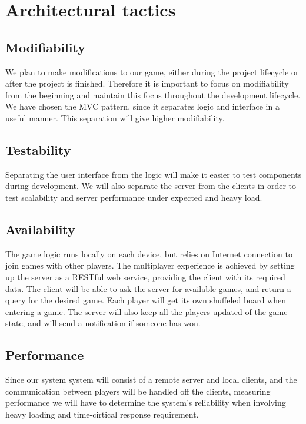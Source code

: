 \section{Architectural tactics}
\label{sec:architecturaltactics}

\subsection{Modifiability} 
We plan to make modifications to our game, either during the project lifecycle or after the project is finished. Therefore it is important to focus on modifiability from the beginning and maintain this focus throughout the development lifecycle. 
We have chosen the MVC pattern, since it separates logic and interface in a useful manner. This separation will give higher modifiability.

\subsection{Testability}
Separating the user interface from the logic will make it easier to test components during development. We will also separate the server from the clients in order to test scalability and server performance under expected and heavy load.


\subsection{Availability} 
The game logic runs locally on each device, but relies on Internet connection to join games with other players. The multiplayer experience is achieved by setting up the server as a RESTful web service, providing the client with its required data. The client will be able to ask the server for available games, and return a query for the desired game. Each player will get its own shuffeled board when entering a game. The server will also keep all the players updated of the game state, and will send a notification if someone has won.


\subsection{Performance}
Since our system system will consist of a remote server and local clients, and the communication between players will be handled off the clients, measuring performance we will have to determine the system's reliability when involving heavy loading and time-cirtical response requirement.

